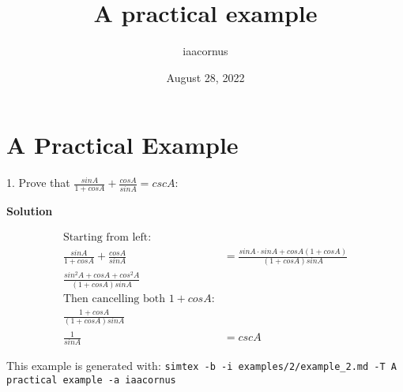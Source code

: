 \documentclass[12pt, UTF8]{article}
\title{A practical example}
\author{iaacornus}
\date{August 28, 2022}
\begin{document}
	\maketitle
	\section{A Practical Example}
	
	1. Prove that $\frac{sin A}{1 + cos A} + \frac{cos A}{sin A} = csc A$:
	
	\textbf{Solution}
	
	\begin{align}
		\text{Starting from left:}\\
		\frac{sin A}{1 + cos A} + \frac{cos A}{sin A} &= \frac{sin A \cdot sin A + cos A (1 + cos A)}{(1 + cos A) sin A}\\
		\frac{sin^2 A + cos A + cos^2 A}{(1 + cos A) sin A}\\
		\text{Then cancelling both $1 + cos A$:}\\
		\frac{1 + cos A}{(1 + cos A) sin A}\\
		\frac{1}{sin A} &= csc A
	\end{align}
	
	This example is generated with: \texttt{simtex -b -i examples/2/example\_2.md  -T A practical example -a iaacornus}
\end{document}
